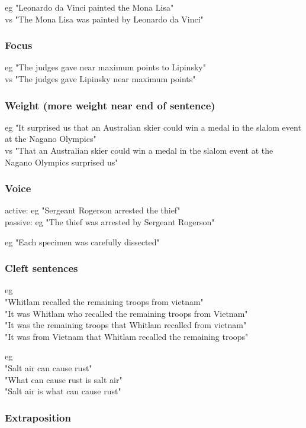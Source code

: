 eg "Leonardo da Vinci painted the Mona Lisa"\\
vs "The Mona Lisa was painted by Leonardo da Vinci"

\subsubsection{Focus}

eg "The judges gave near maximum points to Lipinsky"\\
vs "The judges gave Lipinsky near maximum points"

\subsubsection{Weight (more weight near end of sentence)}

eg "It surprised us that an Australian skier could win a medal in the slalom event at the Nagano Olympics"\\
vs "That an Australian skier could win a medal in the slalom event at the 
Nagano Olympics surprised us"

\subsubsection{Voice}

active: eg "Sergeant Rogerson arrested the thief"\\
passive: eg "The thief was arrested by Sergeant Rogerson"

eg "Each specimen was carefully dissected"

\subsubsection{Cleft sentences}

eg\\
"Whitlam recalled the remaining troops from vietnam"\\
"It was Whitlam who recalled the remaining troops from Vietnam"\\
"It was the remaining troops that Whitlam recalled from vietnam"\\
"It was from Vietnam that Whitlam recalled the remaining troops"

eg\\
"Salt air can cause rust"\\
"What can cause rust is salt air"\\
"Salt air is what can cause rust"

\subsubsection{Extraposition}

